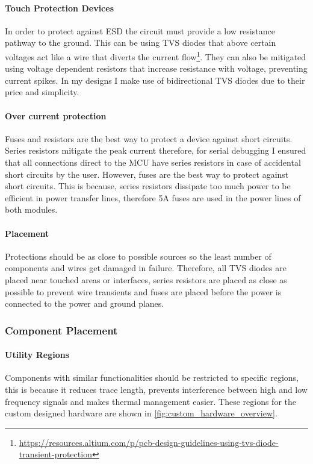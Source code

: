 \paragraph{Touch Protection Devices}
In order to protect against \gls{ESD} the circuit must provide a low resistance pathway to the ground. This can be using \gls{TVS} diodes that above certain voltages act like a wire that diverts the current flow\footnote{\url{https://resources.altium.com/p/pcb-design-guidelines-using-tvs-diode-transient-protection}}. They can also be mitigated using voltage dependent resistors that increase resistance with voltage, preventing current spikes. In my designs I make use of bidirectional \gls{TVS} diodes due to their price and simplicity. 
\paragraph{Over current protection}
Fuses and resistors are the best way to protect a device against short circuits. Series resistors mitigate the peak current therefore, for serial debugging I ensured that all connections direct to the \gls{MCU} have series resistors in case of accidental short circuits by the user. However, fuses are the best way to protect against short circuits. This is because, series resistors dissipate too much power to be efficient in power transfer lines, therefore 5A fuses are used in the power lines of both modules. 
\paragraph{Placement}
Protections should be as close to possible sources so the least number of components and wires get damaged in failure. Therefore, all \gls{TVS} diodes are placed near touched areas or interfaces, series resistors are placed as close as possible to prevent wire transients and fuses are placed before the power is connected to the power and ground planes.

\subsubsection{Component Placement}\label{sub_sub_section:tgt_component_placement}
\paragraph{Utility Regions}
Components with similar functionalities should be restricted to specific regions, this is because it reduces trace length, prevents interference between high and low frequency signals and makes thermal management easier. These regions for the custom designed hardware are shown in \ref{fig:custom_hardware_overview}.
